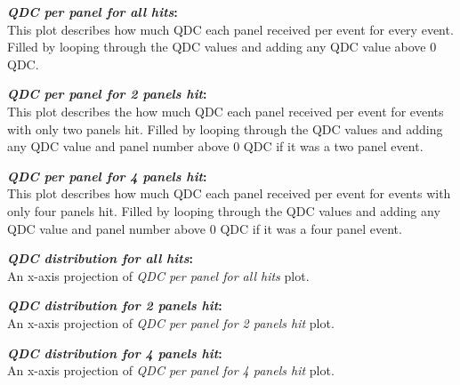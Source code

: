 \documentclass[a4paper,12pt]{article}
\begin{document}
\textbf{\emph{QDC per panel for all hits}:} \\
This plot describes how much QDC each panel received per event for every event. Filled by looping through the QDC values and adding any QDC value above 0 QDC.

\textbf{\emph{QDC per panel for 2 panels hit}:} \\
This plot describes the how much QDC each panel received per event for events with only two panels hit. Filled by looping through the QDC values and adding any QDC value and panel number above 0 QDC if it was a two panel event.

\textbf{\emph{QDC per panel for 4 panels hit}:} \\
This plot describes how much QDC each panel received per event for events with only four panels hit. Filled by looping through the QDC values and adding any QDC value and panel number above 0 QDC if it was a four panel event.

\textbf{\emph{QDC distribution for all hits}:} \\
An x-axis projection of \emph{QDC per panel for all hits} plot.

\textbf{\emph{QDC distribution for 2 panels hit}:} \\
An x-axis projection of \emph{QDC per panel for 2 panels hit} plot.

\textbf{\emph{QDC distribution for 4 panels hit}:} \\
An x-axis projection of \emph{QDC per panel for 4 panels hit} plot.

\pagebreak
\begin{figure}[h]
\centering
{}%
\end{figure}
\end{document}
